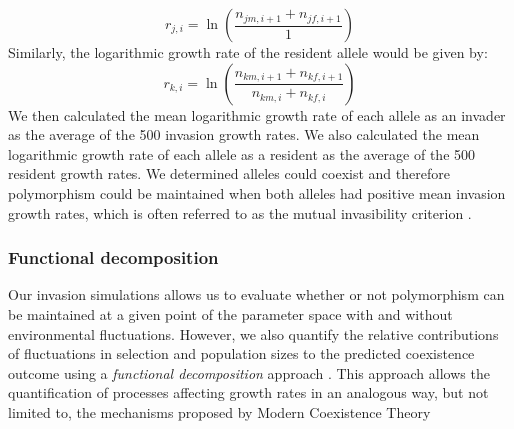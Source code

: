 \begin{refsection}
\begin{equation}
r_{j,i} =	\ln \left ( \frac{n_{jm,i+1 } + n_{jf,i+1}}{1} \right )
\label{invader}
\end{equation}
Similarly, the logarithmic growth rate of the resident allele would be given by:
\begin{equation}
r_{k,i} =	\ln \left ( \frac{ n_{km,i+1} + n_{kf,i+1} }{ n_{km,i} + n_{kf,i}  } \right )
\label{resident}
\end{equation}
We then calculated the mean logarithmic growth rate of each allele as an invader as the average of the 500 invasion growth rates. We also calculated the mean logarithmic growth rate of each allele as a resident as the average of the 500 resident growth rates. We determined alleles could coexist  and therefore polymorphism could be maintained when both alleles had positive mean invasion growth rates, which is often referred to as the mutual invasibility criterion \citep{barabas_chessons_2018}.


\subsubsection*{Functional decomposition}


Our invasion simulations allows us to evaluate whether or not polymorphism can be maintained at a given point of the parameter space with and without environmental fluctuations. However, we also quantify the relative contributions of fluctuations in selection and population sizes to the predicted coexistence outcome using a \textit{functional decomposition} approach \citep{ellner2016quantify,ellner_expanded_2019, shoemaker2020}. This approach allows the quantification of processes affecting growth rates in an analogous way, but not limited to, the mechanisms proposed by Modern Coexistence Theory \citep{ ellner2016quantify, ellner_expanded_2019}




\end{refsection}
